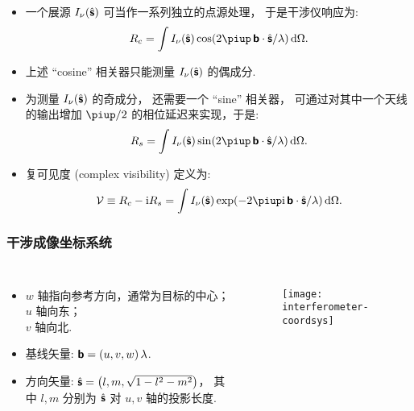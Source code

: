 \documentclass{beamer}
\begin{document}
\begin{frame}
  \begin{itemize}
    \item 一个展源 $I_{\nu}(\hat{\bm{\mathsf{s}}})$ 可当作一系列独立的点源处理，
      于是干涉仪响应为:
      \begin{equation}
        R_c = \int I_{\nu}(\hat{\B{s}})
          \cos (2\Cpi\, \B{b} \cdot \hat{\B{s}} / \lambda) \,\D{\Omega} .
      \end{equation}
    \item 上述 \enquote{cosine} 相关器只能测量 $I_{\nu}(\hat{\bm{\mathsf{s}}})$ 的偶成分.
    \item 为测量 $I_{\nu}(\hat{\bm{\mathsf{s}}})$ 的奇成分，
      还需要一个 \enquote{sine} 相关器，
      可通过对其中一个天线的输出增加 $\Cpi/2$ 的相位延迟来实现，于是:
      \begin{equation}
        R_s = \int I_{\nu}(\hat{\B{s}})
          \sin (2\Cpi\, \B{b} \cdot \hat{\B{s}} / \lambda) \,\D{\Omega} .
      \end{equation}
    \item \alert{复可见度 (complex visibility)} 定义为:
      \begin{equation}
        \mathcal{V}
          \equiv R_c - \Ci R_s
          = \int I_{\nu}(\hat{\B{s}})
            \exp (- 2\Cpi\Ci\, \B{b} \cdot \hat{\B{s}} / \lambda)
            \,\D{\Omega} .
      \end{equation}
  \end{itemize}
\end{frame}

\begin{frame}[subsec]
  \frametitle{干涉成像坐标系统}
  \begin{columns}[onlytextwidth]
    \begin{itemize}
      \item $w$ 轴指向参考方向，通常为目标的中心； \\
        $u$ 轴向东； \\
        $v$ 轴向北.
      \item 基线矢量: $\bm{\mathsf{b}} = (u,v,w) \,\lambda$.
      \item 方向矢量: $\hat{\bm{\mathsf{s}}} = \left( l, m, \sqrt{1-l^2-m^2} \right)$，
        其中 $l, m$ 分别为 $\hat{\bm{\mathsf{s}}}$ 对 $u, v$ 轴的投影长度.
    \end{itemize}

    \begin{figure}
      \centering
      \texttt{[image: interferometer-coordsys]}
    \end{figure}
  \end{columns}

\end{frame}
\end{document}
